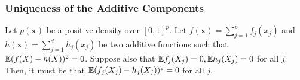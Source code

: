 


\subsubsection{Uniqueness of the Additive Components}
 
\begin{lemma}
\label{lem:additive_uniqueness}
Let $p(\mathbf{x})$ be a positive density over $[0,1]^p$. Let $f(\mathbf{x}) = \sum_{j=1}^p f_j(x_j)$ and $h(\mathbf{x}) = \sum_{j=1}^d h_j(x_j)$ be two additive functions such that ${\mathbb E}( f(X) - h(X) )^2 = 0$. Suppose also that ${\mathbb E} f_j(X_j) = 0, {\mathbb E} h_j(X_j) = 0$ for all $j$. Then, it must be that ${\mathbb E}( f_j(X_j) - h_j(X_j))^2 = 0$ for all $j$.
\end{lemma}

